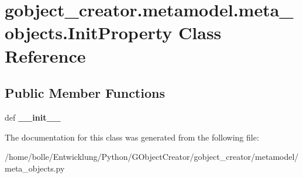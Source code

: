 \hypertarget{classgobject__creator_1_1metamodel_1_1meta__objects_1_1InitProperty}{
\section{gobject\_\-creator.metamodel.meta\_\-objects.InitProperty Class Reference}
\label{classgobject__creator_1_1metamodel_1_1meta__objects_1_1InitProperty}
}
\subsection*{Public Member Functions}
\begin{DoxyCompactItemize}
\item 
\hypertarget{classgobject__creator_1_1metamodel_1_1meta__objects_1_1InitProperty_ae6264b67d1d4a042ac719a84d7bb408b}{
def {\bfseries \_\-\_\-init\_\-\_\-}}
\label{classgobject__creator_1_1metamodel_1_1meta__objects_1_1InitProperty_ae6264b67d1d4a042ac719a84d7bb408b}

\end{DoxyCompactItemize}


The documentation for this class was generated from the following file:\begin{DoxyCompactItemize}
\item 
/home/bolle/Entwicklung/Python/GObjectCreator/gobject\_\-creator/metamodel/meta\_\-objects.py\end{DoxyCompactItemize}
